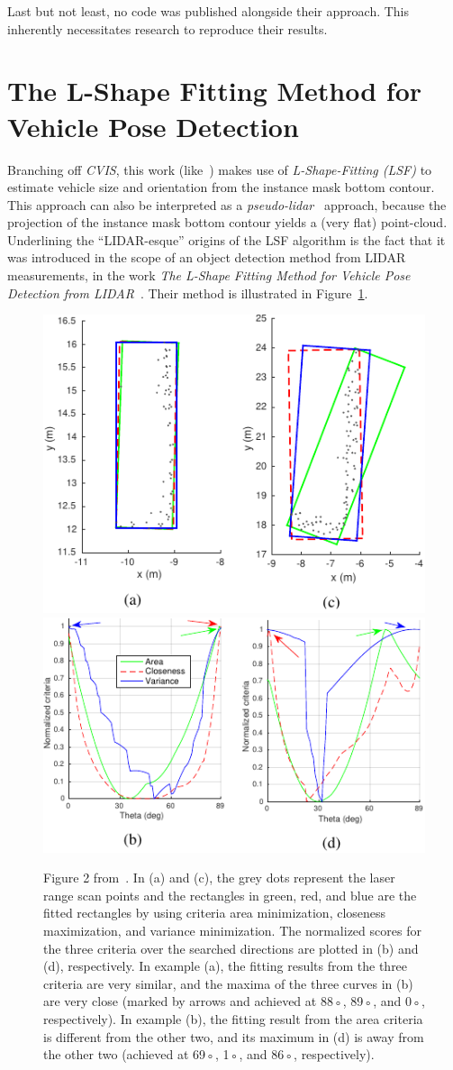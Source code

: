 Last but not least, no code was published alongside their approach.
This inherently necessitates research to reproduce their results.

\section{The L-Shape Fitting Method for Vehicle Pose Detection}
\label{sec:related-lshape-fitting}

Branching off \textit{CVIS}, this work (like~\cite{leonthesis}) makes use of \textit{L-Shape-Fitting (LSF)} to estimate vehicle size and orientation from the instance mask bottom contour.
This approach can also be interpreted as a \textit{pseudo-lidar}~\cite{survey2022} approach, because the projection of the instance mask bottom contour yields a (very flat) point-cloud.
Underlining the \enquote{LIDAR-esque} origins of the LSF algorithm is the fact that it was introduced in the scope of an object detection method from LIDAR measurements, in the work \textit{The L-Shape Fitting Method for Vehicle Pose Detection from LIDAR}~\cite{zhang2017efficient}.
Their method is illustrated in Figure~\ref{fig:related-lsf}.

\begin{figure}[htb]
    \centering
    \includegraphics[width=0.49\linewidth]{figures/l_shape_fitting_fig_2_1-cropped}
    \includegraphics[width=0.49\linewidth]{figures/l_shape_fitting_fig_2_2-cropped}
    \caption{Figure 2 from~\cite{zhang2017efficient}. In (a) and (c), the grey dots represent the laser range scan points and the rectangles in green, red, and blue are the fitted rectangles by using criteria area minimization, closeness maximization, and variance minimization. The normalized scores for the three criteria over the searched directions are plotted in (b) and (d), respectively. In example (a), the fitting results from the three criteria are very similar, and the maxima of the three curves in (b) are very close (marked by arrows and achieved at 88◦, 89◦, and 0◦, respectively). In example (b), the fitting result from the area criteria is different from the other two, and its maximum in (d) is away from the other two (achieved at 69◦, 1◦, and 86◦, respectively).}
    \label{fig:related-lsf}
\end{figure}


